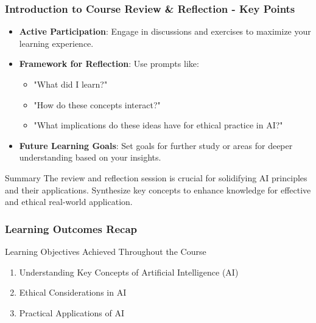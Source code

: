 \documentclass[aspectratio=169]{beamer}
\begin{document}
\begin{frame}[fragile]
    \frametitle{Introduction to Course Review \& Reflection - Key Points}
    \begin{itemize}
        \item \textbf{Active Participation}: Engage in discussions and exercises to maximize your learning experience.
        \item \textbf{Framework for Reflection}: Use prompts like:
        \begin{itemize}
            \item "What did I learn?"
            \item "How do these concepts interact?"
            \item "What implications do these ideas have for ethical practice in AI?"
        \end{itemize}
        \item \textbf{Future Learning Goals}: Set goals for further study or areas for deeper understanding based on your insights.
    \end{itemize}
    \begin{block}{Summary}
        The review and reflection session is crucial for solidifying AI principles and their applications. Synthesize key concepts to enhance knowledge for effective and ethical real-world application.
    \end{block}
\end{frame}

\begin{frame}[fragile]
    \frametitle{Learning Outcomes Recap}
    \begin{block}{Learning Objectives Achieved Throughout the Course}
        \begin{enumerate}
            \item Understanding Key Concepts of Artificial Intelligence (AI)
            \item Ethical Considerations in AI
            \item Practical Applications of AI
        \end{enumerate}
    \end{block}
\end{frame}
\end{document}
